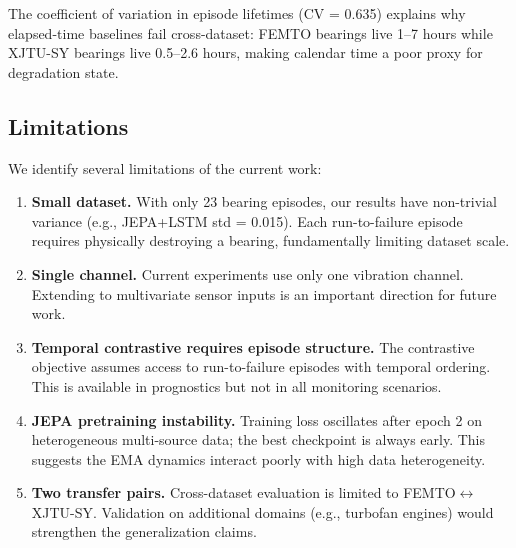 The coefficient of variation in episode lifetimes (CV = 0.635) explains why elapsed-time baselines fail cross-dataset: FEMTO bearings live 1--7 hours while XJTU-SY bearings live 0.5--2.6 hours, making calendar time a poor proxy for degradation state.

\subsection{Limitations}
\label{sec:limitations}

We identify several limitations of the current work:

\begin{enumerate}[nosep]
  \item \textbf{Small dataset.} With only 23 bearing episodes, our results have non-trivial variance (e.g., JEPA+LSTM std = 0.015). Each run-to-failure episode requires physically destroying a bearing, fundamentally limiting dataset scale.
  \item \textbf{Single channel.} Current experiments use only one vibration channel. Extending to multivariate sensor inputs is an important direction for future work.
  \item \textbf{Temporal contrastive requires episode structure.} The contrastive objective assumes access to run-to-failure episodes with temporal ordering. This is available in prognostics but not in all monitoring scenarios.
  \item \textbf{JEPA pretraining instability.} Training loss oscillates after epoch 2 on heterogeneous multi-source data; the best checkpoint is always early. This suggests the EMA dynamics interact poorly with high data heterogeneity.
  \item \textbf{Two transfer pairs.} Cross-dataset evaluation is limited to FEMTO$\leftrightarrow$XJTU-SY. Validation on additional domains (e.g., turbofan engines) would strengthen the generalization claims.
\end{enumerate}
